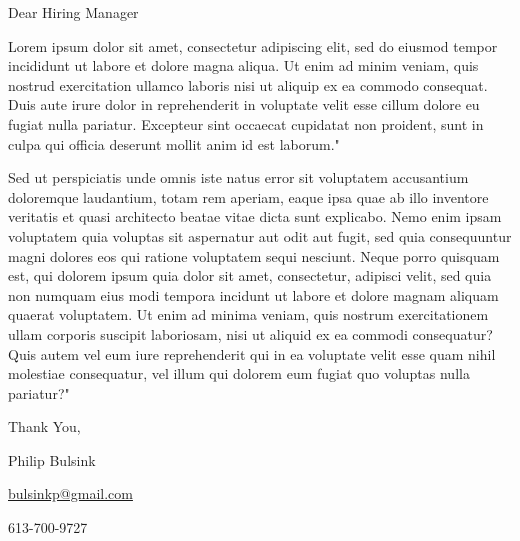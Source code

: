 \documentclass[11pt]{letter}
\begin{document}
    Dear Hiring Manager

    Lorem ipsum dolor sit amet, consectetur adipiscing elit, sed do
eiusmod tempor incididunt ut labore et dolore magna aliqua. Ut enim ad
minim veniam, quis nostrud exercitation ullamco laboris nisi ut aliquip
ex ea commodo consequat. Duis aute irure dolor in reprehenderit in
voluptate velit esse cillum dolore eu fugiat nulla pariatur. Excepteur
sint occaecat cupidatat non proident, sunt in culpa qui officia deserunt
 mollit anim id est laborum."

    Sed ut perspiciatis unde omnis iste natus error sit voluptatem accusantium
doloremque laudantium, totam rem aperiam, eaque ipsa quae ab illo
inventore veritatis et quasi architecto beatae vitae dicta sunt
explicabo. Nemo enim ipsam voluptatem quia voluptas sit aspernatur aut
odit aut fugit, sed quia consequuntur magni dolores eos qui ratione
voluptatem sequi nesciunt. Neque porro quisquam est, qui dolorem ipsum
quia dolor sit amet, consectetur, adipisci velit, sed quia non numquam
eius modi tempora incidunt ut labore et dolore magnam aliquam quaerat
voluptatem. Ut enim ad minima veniam, quis nostrum exercitationem ullam
corporis suscipit laboriosam, nisi ut aliquid ex ea commodi consequatur?
 Quis autem vel eum iure reprehenderit qui in ea voluptate velit esse
quam nihil molestiae consequatur, vel illum qui dolorem eum fugiat quo
voluptas nulla pariatur?"

    Thank You,

    Philip Bulsink

    \href{mailto:bulsinkp@gmail.com}{bulsinkp@gmail.com}

    613-700-9727
\end{document}
